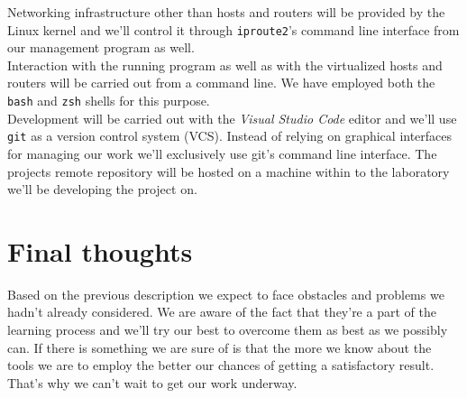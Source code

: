 \documentclass[12pt]{article}
\begin{document}
        Networking infrastructure other than hosts and routers will be provided by the Linux kernel and we'll control it through \texttt{iproute2}'s command line interface from our management program as well.\\

        Interaction with the running program as well as with the virtualized hosts and routers will be carried out from a command line. We have employed both the \texttt{bash} and \texttt{zsh} shells for this purpose.\\

        Development will be carried out with the \textit{Visual Studio Code} editor and we'll use \texttt{git} as a version control system (VCS). Instead of relying on graphical interfaces for managing our work we'll exclusively use git's command line interface. The projects remote repository will be hosted on a machine within to the laboratory we'll be developing the project on.\\

    \section{Final thoughts}
        Based on the previous description we expect to face obstacles and problems we hadn't already considered. We are aware of the fact that they're a part of the learning process and we'll try our best to overcome them as best as we possibly can. If there is something we are sure of is that the more we know about the tools we are to employ the better our chances of getting a satisfactory result. That's why we can't wait to get our work underway.\\

    
    {}
\end{document}
